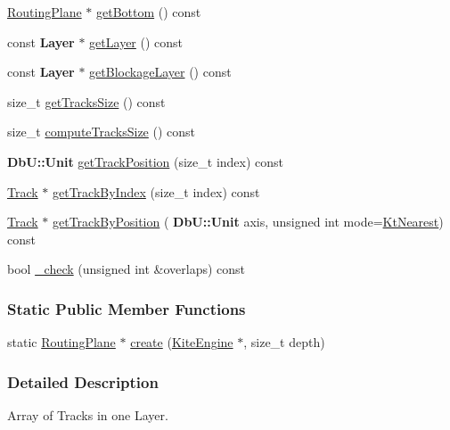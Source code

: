 \begin{DoxyCompactItemize}
\hyperlink{classKite_1_1RoutingPlane}{Routing\+Plane} $\ast$ \hyperlink{classKite_1_1RoutingPlane_a7478ed4841ef25190c021165dd457520}{get\+Bottom} () const
\item 
const \textbf{ Layer} $\ast$ \hyperlink{classKite_1_1RoutingPlane_ab045567c4f529dca7790d66c17c3084f}{get\+Layer} () const
\item 
const \textbf{ Layer} $\ast$ \hyperlink{classKite_1_1RoutingPlane_a4e47dfca4bfafa56d9c0f1dc39dc237e}{get\+Blockage\+Layer} () const
\item 
size\+\_\+t \hyperlink{classKite_1_1RoutingPlane_aa44eb6d4806e49d36bf273cd9d979197}{get\+Tracks\+Size} () const
\item 
size\+\_\+t \hyperlink{classKite_1_1RoutingPlane_a4b4c6bb50297d585962d84b2a165e139}{compute\+Tracks\+Size} () const
\item 
\textbf{ Db\+U\+::\+Unit} \hyperlink{classKite_1_1RoutingPlane_ae2ea9830bfcd3d7f36af63bcad3eed6e}{get\+Track\+Position} (size\+\_\+t index) const
\item 
\hyperlink{classKite_1_1Track}{Track} $\ast$ \hyperlink{classKite_1_1RoutingPlane_a5e9defabb4cb2cb1b0f73b1dc3c677de}{get\+Track\+By\+Index} (size\+\_\+t index) const
\item 
\hyperlink{classKite_1_1Track}{Track} $\ast$ \hyperlink{classKite_1_1RoutingPlane_a8c464eebfa0f85d0b9f4677bb191100c}{get\+Track\+By\+Position} (\textbf{ Db\+U\+::\+Unit} axis, unsigned int mode=\hyperlink{namespaceKite_acca8fffa3182dea5f94208f454f14b47afaf04b2ddbae58557683c20373c0bada}{Kt\+Nearest}) const
\item 
bool \hyperlink{classKite_1_1RoutingPlane_aeea9a19f9b402ffe42c011c9afc2ca73}{\+\_\+check} (unsigned int \&overlaps) const
\end{DoxyCompactItemize}
\subsubsection*{Static Public Member Functions}
\begin{DoxyCompactItemize}
\item 
static \hyperlink{classKite_1_1RoutingPlane}{Routing\+Plane} $\ast$ \hyperlink{classKite_1_1RoutingPlane_a91d1fdb3aac133a9f687207499caf1c4}{create} (\hyperlink{classKite_1_1KiteEngine}{Kite\+Engine} $\ast$, size\+\_\+t depth)
\end{DoxyCompactItemize}


\subsubsection{Detailed Description}
Array of Tracks in one Layer. 

